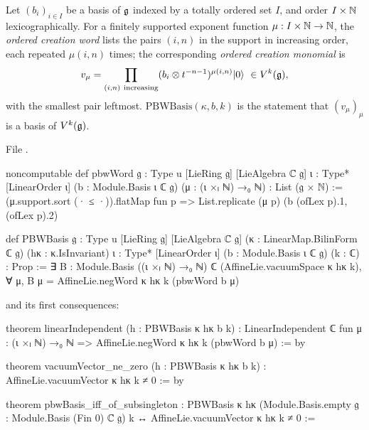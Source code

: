 \begin{definition}\label{l02:def:pbwbasis}
Let $(b_i)_{i\in I}$ be a basis of $\mathfrak{g}$ indexed by a totally ordered set $I$, and order $I\times{\mathbb{N}}$
lexicographically. For a finitely supported exponent function $\mu : I\times{\mathbb{N}}\to{\mathbb{N}}$, the
\emph{ordered creation word} lists the pairs $(i,n)$ in the support in increasing order, each repeated
$\mu(i,n)$ times; the corresponding \emph{ordered creation monomial} is
\begin{equation*}
 v_\mu = \prod_{(i,n)\ \text{increasing}}(b_i\otimes t^{-n-1})^{\mu(i,n)}\ltwovac\ \in V^k(\ltwog),
\end{equation*}
with the smallest pair leftmost. \emph{$\mathrm{PBWBasis}(\kappa,b,k)$} is the statement that
$(v_\mu)_\mu$ is a basis of $V^k(\mathfrak{g})$.
\end{definition}

File .
\begin{leancode}
noncomputable def pbwWord {𝔤 : Type u} [LieRing 𝔤] [LieAlgebra ℂ 𝔤] {ι : Type*} [LinearOrder ι]
    (b : Module.Basis ι ℂ 𝔤) (μ : (ι ×ₗ ℕ) →₀ ℕ) : List (𝔤 × ℕ) :=
  (μ.support.sort (· ≤ ·)).flatMap fun p => List.replicate (μ p) (b (ofLex p).1, (ofLex p).2)

def PBWBasis {𝔤 : Type u} [LieRing 𝔤] [LieAlgebra ℂ 𝔤]
    (κ : LinearMap.BilinForm ℂ 𝔤) (hκ : κ.IsInvariant)
    {ι : Type*} [LinearOrder ι] (b : Module.Basis ι ℂ 𝔤) (k : ℂ) : Prop :=
  ∃ B : Module.Basis ((ι ×ₗ ℕ) →₀ ℕ) ℂ (AffineLie.vacuumSpace κ hκ k),
    ∀ μ, B μ = AffineLie.negWord κ hκ k (pbwWord b μ)
\end{leancode}
and its first consequences:
\begin{leancode}
theorem linearIndependent (h : PBWBasis κ hκ b k) :
    LinearIndependent ℂ fun μ : (ι ×ₗ ℕ) →₀ ℕ => AffineLie.negWord κ hκ k (pbwWord b μ) := by

theorem vacuumVector_ne_zero (h : PBWBasis κ hκ b k) :
    AffineLie.vacuumVector κ hκ k ≠ 0 := by

theorem pbwBasis_iff_of_subsingleton :
    PBWBasis κ hκ (Module.Basis.empty 𝔤 : Module.Basis (Fin 0) ℂ 𝔤) k
      ↔ AffineLie.vacuumVector κ hκ k ≠ 0 :=
\end{leancode}

